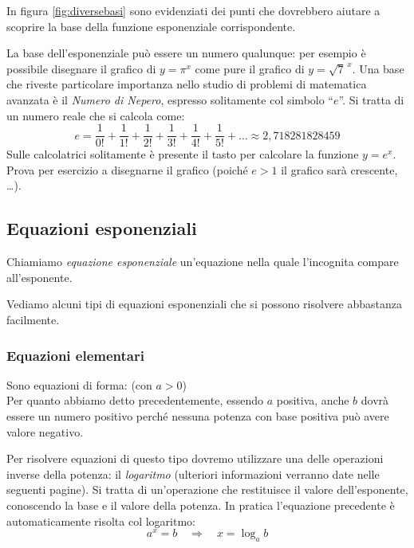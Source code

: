 In figura \ref{fig:diversebasi} sono evidenziati dei punti che dovrebbero 
aiutare a scoprire la base della funzione esponenziale corrispondente.

\begin{osservazione}
La base dell'esponenziale può essere un numero qualunque: per esempio è possibile disegnare il grafico di $y=\pi^x$
come pure il grafico di $y = \sqrt{7}^{\,x}$. Una base che riveste particolare importanza nello studio di
problemi di matematica avanzata è il \emph{Numero di Nepero}, espresso solitamente col simbolo ``$e$''.
Si tratta di un numero reale che si calcola come:
\[e = \frac{1}{0!}+\frac{1}{1!}+\frac{1}{2!}+\frac{1}{3!}+\frac{1}{4!}+\frac{1}{5!}+\dots \approx 2,718281828459\]
Sulle calcolatrici solitamente è presente il tasto per calcolare la funzione $y = e^x$. Prova per esercizio a disegnarne il grafico
(poiché $e>1$ il grafico sarà crescente, \dots).
\end{osservazione}



\subsection{Equazioni esponenziali}
\label{subsec:esplog_equazioniesponenziali}

\begin{definizione}{
Chiamiamo \emph{equazione esponenziale} un'equazione nella quale l'incognita compare all'esponente.
}
\end{definizione}

Vediamo alcuni tipi di equazioni esponenziali che si possono risolvere 
abbastanza facilmente.

\subsubsection{Equazioni elementari}
\label{subsubsec:esplog_eq_elementari}

Sono equazioni di forma:  \;\;  \quad (con $a>0$)\\[4pt]
Per quanto abbiamo detto precedentemente, essendo \(a\) positiva, anche \(b\) 
dovrà essere un numero positivo perché nessuna potenza con base positiva può 
avere valore negativo.

Per risolvere equazioni di questo tipo dovremo utilizzare una delle 
operazioni inverse della potenza: il \emph{logaritmo} (ulteriori informazioni verranno
date nelle seguenti pagine). Si tratta di un'operazione che 
restituisce il valore dell'esponente, conoscendo la base e il valore della potenza. 
In pratica l'equazione precedente è automaticamente risolta col logaritmo:
\[ a^x=b \quad \Longrightarrow \quad x = \log_a b\]


